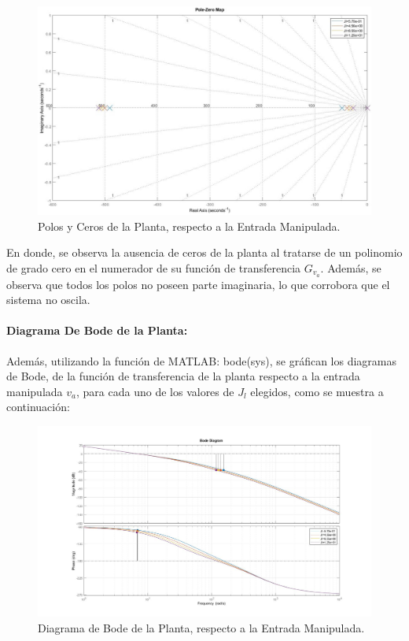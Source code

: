 \documentclass{article}
\begin{document}
\begin{sloppypar}
\begin{figure}[H]
    \centering
    \includegraphics[width=1\textwidth]{Polos y Ceros de la Planta, respecto a la Entrada Manipulada}
    \caption{Polos y Ceros de la Planta, respecto a la Entrada Manipulada.}
    \label{fig:Polos y Ceros de la Planta, respecto a la Entrada Manipulada}
\end{figure}

En donde, se observa la ausencia de ceros de la planta al tratarse de un polinomio de grado cero en el numerador de su función de transferencia $G_{v_a}$. Además, se observa que todos los polos no poseen parte imaginaria, lo que corrobora que el sistema no oscila.

\paragraph{Diagrama De Bode de la Planta:}
\label{sec:Diagrama De Bode de la Planta:}
\hfill

\hfill

Además, utilizando la función de MATLAB: bode(sys), se gráfican los diagramas de Bode, de la función de transferencia de la planta respecto a la entrada manipulada $v_a$, para cada uno de los valores de $J_l$ elegidos, como se muestra a continuación:

\begin{figure}[H]
    \centering
    \includegraphics[width=1\textwidth]{Diagrama de Bode de la Planta, respecto a la Entrada Manipulada}
    \caption{Diagrama de Bode de la Planta, respecto a la Entrada Manipulada.}
    \label{fig:Diagrama de Bode de la Planta, respecto a la Entrada Manipulada}
\end{figure}


\end{sloppypar}
\end{document}
